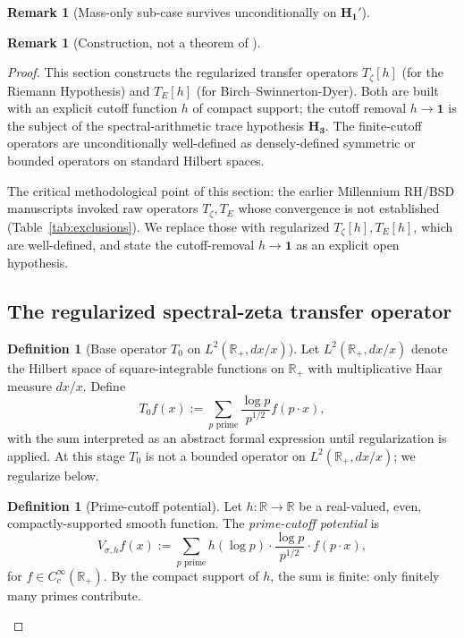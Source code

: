 \documentclass[11pt, a4paper]{amsart}
\theoremstyle{definition}
\newtheorem{definition}[theorem]{Definition}
\newtheorem{remark}[theorem]{Remark}
\newcommand{\R}{\mathbb{R}}
\begin{document}
\begin{remark}[Mass-only sub-case survives unconditionally on $\mathbf{H_1'}$]
\begin{remark}[Construction, not a theorem of \cite{CascadeEmbeddings}]
\begin{proof}
This section constructs the regularized transfer operators
$T_\zeta[h]$ (for the Riemann Hypothesis) and $T_E[h]$ (for
Birch--Swinnerton-Dyer). Both are built with an explicit cutoff
function $h$ of compact support; the cutoff removal $h \to
\mathbf{1}$ is the subject of the spectral-arithmetic trace
hypothesis $\mathbf{H_3}$. The finite-cutoff operators are
unconditionally well-defined as densely-defined symmetric or
bounded operators on standard Hilbert spaces.

The critical methodological point of this section: the earlier
Millennium RH/BSD manuscripts invoked raw operators $T_\zeta, T_E$
whose convergence is not established (Table~\ref{tab:exclusions}).
We replace those with regularized $T_\zeta[h], T_E[h]$, which are
well-defined, and state the cutoff-removal $h \to \mathbf{1}$ as
an explicit open hypothesis.

\subsection{The regularized spectral-zeta transfer operator}
\label{subsec:Tzeta-h}

\begin{definition}[Base operator $T_0$ on $L^2(\R_+, dx/x)$]
\label{def:T0}
Let $L^2(\R_+, dx/x)$ denote the Hilbert space of square-integrable
functions on $\R_+$ with multiplicative Haar measure
$dx/x$. Define
\[
  T_0 f(x) := \sum_{p \text{ prime}} \frac{\log p}{p^{1/2}}
    f(p \cdot x),
\]
with the sum interpreted as an abstract formal expression until
regularization is applied. At this stage $T_0$ is not a bounded
operator on $L^2(\R_+, dx/x)$; we regularize below.
\end{definition}

\begin{definition}[Prime-cutoff potential]
\label{def:Vsigma-h}
Let $h \colon \R \to \R$ be a real-valued, even, compactly-supported
smooth function. The \emph{prime-cutoff potential} is
\[
  V_{\sigma, h} f(x)
  := \sum_{p \text{ prime}} h(\log p) \cdot
    \frac{\log p}{p^{1/2}} \cdot f(p \cdot x),
\]
for $f \in C_c^\infty(\R_+)$. By the compact support of $h$, the
sum is finite: only finitely many primes contribute.
\end{definition}


\end{proof}
\end{remark}
\end{remark}
\end{document}
